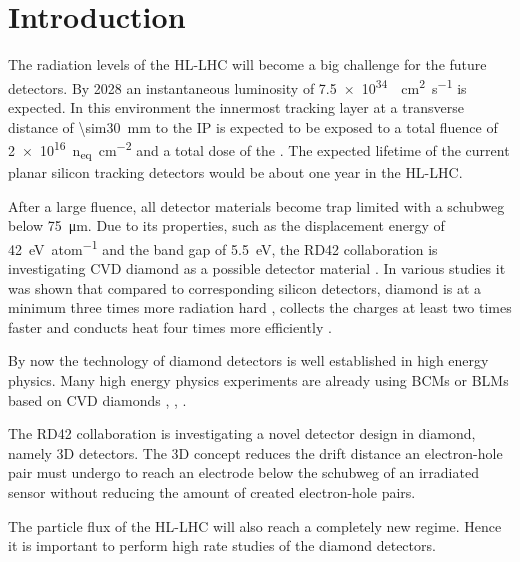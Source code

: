 \section{Introduction}
The radiation levels of the \ac{HL-LHC} will become a big challenge for the future detectors. By 2028 an instantaneous luminosity of \SI{7.5e34}{\per\centi\meter\squared\per\second} is expected. In this environment the innermost tracking layer at a transverse distance of \SI{\sim30}{\milli\meter} to the \acl{IP} is expected to be exposed to a total fluence of \SI{2e16}{n_{eq}\per\centi\meter^2} and a total dose of the  \cite{dose}. The expected lifetime of the current planar silicon tracking detectors would be about one year in the \ac{HL-LHC}.\par
After a large fluence, all detector materials become trap limited with a schubweg below \SI{75}{\micro\meter}. Due to its properties, such as the displacement energy of \SI{42}{\electronvolt\per atom} and the band gap of \SI{5.5}{\electronvolt}, the RD42 collaboration is investigating \ac{CVD} diamond as a possible detector material \cite{rd42}. In various studies it was shown that compared to corresponding silicon detectors, diamond is at a minimum three times more radiation hard \cite{deboer}, collects the charges at least two times faster \cite{pernegger} and conducts heat four times more efficiently \cite{zhao}.\par
By now the technology of diamond detectors is well established in high energy physics. Many high energy physics experiments are already using \aclp{BCM} or \aclp{BLM} based on \ac{CVD} diamonds \cite{babar}, \cite{bcm}, \cite{dbm1}.\par
The RD42 collaboration is investigating a novel detector design in diamond, namely 3D detectors. The 3D concept reduces the drift distance an electron-hole pair must undergo to reach an electrode below the schubweg of an irradiated sensor without reducing the amount of created electron-hole pairs.\par
The particle flux of the \ac{HL-LHC} will also reach a completely new regime. Hence it is important to perform high rate studies of the diamond detectors.
